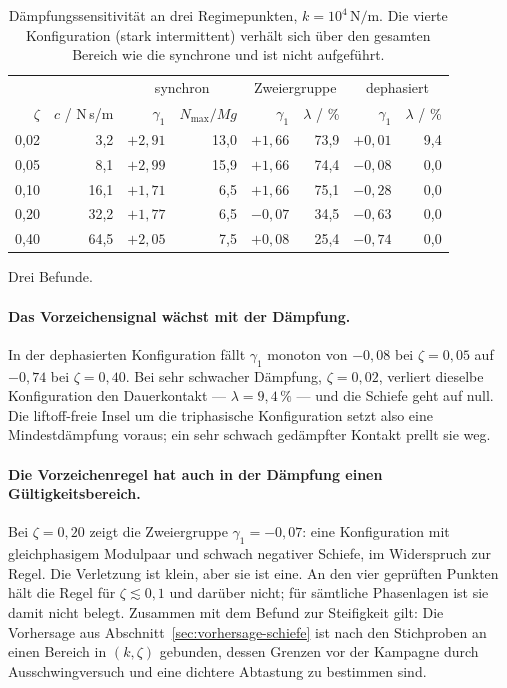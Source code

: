 \documentclass[12pt,a4paper]{report}
\begin{document}
\begin{table}[htbp]
  \centering
  \begin{tabular}{rr|rr|rr|rr}
    \hline
    & & \multicolumn{2}{c|}{synchron} & \multicolumn{2}{c|}{Zweiergruppe} & \multicolumn{2}{c}{dephasiert} \\
    $\zeta$ & $c$ / N\,s/m & $\gamma_1$ & $N_{\max}/Mg$ & $\gamma_1$ & $\lambda$ / \% & $\gamma_1$ & $\lambda$ / \% \\
    \hline
    0{,}02 &  3{,}2 & $+2{,}91$ & 13{,}0 & $+1{,}66$ & 73{,}9 & $+0{,}01$ & 9{,}4 \\
    0{,}05 &  8{,}1 & $+2{,}99$ & 15{,}9 & $+1{,}66$ & 74{,}4 & $-0{,}08$ & 0{,}0 \\
    0{,}10 & 16{,}1 & $+1{,}71$ &  6{,}5 & $+1{,}66$ & 75{,}1 & $-0{,}28$ & 0{,}0 \\
    0{,}20 & 32{,}2 & $+1{,}77$ &  6{,}5 & $-0{,}07$ & 34{,}5 & $-0{,}63$ & 0{,}0 \\
    0{,}40 & 64{,}5 & $+2{,}05$ &  7{,}5 & $+0{,}08$ & 25{,}4 & $-0{,}74$ & 0{,}0 \\
    \hline
  \end{tabular}
  \caption{Dämpfungssensitivität an drei Regimepunkten,
  $k = 10^{4}\,\mathrm{N/m}$. Die vierte Konfiguration (stark
  intermittent) verhält sich über den gesamten Bereich wie die
  synchrone und ist nicht aufgeführt.}
  \label{tab:sens-zeta}
\end{table}

Drei Befunde.

\paragraph{Das Vorzeichensignal wächst mit der Dämpfung.} In der
dephasierten Konfiguration fällt $\gamma_1$ monoton von $-0{,}08$ bei
$\zeta = 0{,}05$ auf $-0{,}74$ bei $\zeta = 0{,}40$. Bei sehr schwacher
Dämpfung, $\zeta = 0{,}02$, verliert dieselbe Konfiguration den
Dauerkontakt --- $\lambda = 9{,}4\,\%$ --- und die Schiefe geht auf
null. Die liftoff-freie Insel um die triphasische Konfiguration setzt
also eine Mindestdämpfung voraus; ein sehr schwach gedämpfter Kontakt
prellt sie weg.

\paragraph{Die Vorzeichenregel hat auch in der Dämpfung einen
Gültigkeitsbereich.} Bei $\zeta = 0{,}20$ zeigt die Zweiergruppe
$\gamma_1 = -0{,}07$: eine Konfiguration mit gleichphasigem Modulpaar
und schwach negativer Schiefe, im Widerspruch zur Regel. Die Verletzung
ist klein, aber sie ist eine. An den vier geprüften Punkten hält die
Regel für $\zeta \lesssim 0{,}1$ und darüber nicht; für sämtliche
Phasenlagen ist sie damit nicht belegt. Zusammen mit dem Befund zur
Steifigkeit gilt: Die Vorhersage aus
Abschnitt~\ref{sec:vorhersage-schiefe} ist nach den Stichproben an
einen Bereich in $(k, \zeta)$ gebunden, dessen Grenzen vor der Kampagne
durch Ausschwingversuch und eine dichtere Abtastung zu bestimmen sind.
\end{document}
